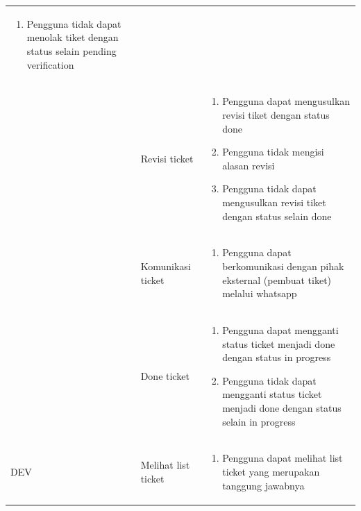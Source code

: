 \documentclass[12pt]{article}
\begin{document}
\begin{enumerate}[label=\textbf{5.\arabic*.}]
\begin{enumerate}[label=\textbf{5.2.\arabic*.}]
\begin{longtable}{ |l|l|p{}| }
\begin{enumerate}[label=\arabic*.]
                                                                \item Pengguna tidak dapat menolak tiket dengan status selain pending verification
                                                            \end{enumerate}\\\cline{2-3}
                                & Revisi ticket         & \begin{enumerate}[label=\arabic*.]
                                                                \item Pengguna dapat mengusulkan revisi tiket dengan status done
                                                                \item Pengguna tidak mengisi alasan revisi
                                                                \item Pengguna tidak dapat mengusulkan revisi tiket dengan status selain done
                                                            \end{enumerate}\\\cline{2-3}
                                & Komunikasi ticket     & \begin{enumerate}[label=\arabic*.]
                                                                \item Pengguna dapat berkomunikasi dengan pihak eksternal (pembuat tiket) melalui whatsapp 
                                                            \end{enumerate}\\\cline{2-3}
                                & Done ticket           & \begin{enumerate}[label=\arabic*.]
                                                                \item Pengguna dapat mengganti status ticket menjadi done dengan status in progress
                                                                \item Pengguna tidak dapat mengganti status ticket menjadi done dengan status selain in progress
                                                            \end{enumerate}\\\cline{2-3}
            \hline
            \multirow{4}{*}{DEV} & Melihat list ticket  & \begin{enumerate}[label=\arabic*.] 
                                                                \item Pengguna dapat melihat list ticket yang merupakan tanggung jawabnya 

\end{enumerate}
\end{longtable}
\end{enumerate}
\end{enumerate}
\end{document}

